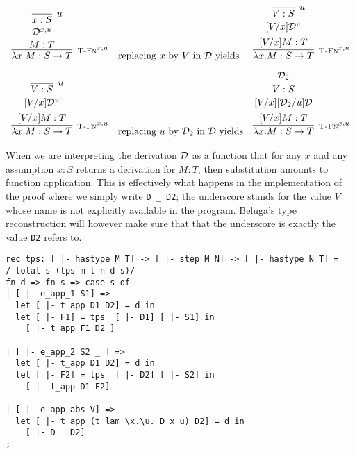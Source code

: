 \[
\begin{array}{c@{\quad}l@{\quad}c}
\infer[\TFn^{x,u}]
      {\lam x. M : S \arrow T}
      {\deduce[\vspace{2pt}]{M:T}
              {\deduce[\vspace{2pt}]{\D^{x,u}}
                      {\infer[u]{x:S}{}}}} &
\mbox{replacing $x$ by $V$ in $\D$ yields} &
\infer[\TFn^{x,u}]
      {\lam x. M : S \arrow T}
      {\deduce[\vspace{2pt}]{[V/x] M:T}
              {\deduce[\vspace{2pt}]{[V/x]\D^{u}}
                      {\infer[u]{V:S}{}}}}\\[1em]
\infer[\TFn^{x,u}]
      {\lam x. M : S \arrow T}
      {\deduce[\vspace{2pt}]{[V/x] M:T}
              {\deduce[\vspace{2pt}]{[V/x]\D^{u}}
                      {\infer[u]{V:S}{}}}} &
\mbox{replacing $u$ by $\D_2$ in $\D$ yields} &
\infer[\TFn^{x,u}]
      {\lam x. M : S \arrow T}
      {\deduce[\vspace{2pt}]{[V/x] M:T}
              {\deduce[\vspace{2pt}]{[V/x][\D_2/u]\D}
                      {\deduce[\vspace{2pt}]{V:S}{\D_2}}}}
\end{array}
\]

When we are interpreting the derivation ${\mathcal{D}}$ as a function that
for any $x$ and any assumption $x:S$ returns a derivation for $M:T$,
then substitution amounts to function application. This is effectively
what happens in the implementation of the proof where we simply write
\lstinline!D _ D2!; the underscore stands for the value $V$ whose name
is not explicitly available in the program. Beluga's type
reconstruction will however make sure that that the underscore is
exactly the value \lstinline!D2! refers to.


\begin{lstlisting}
rec tps: [ |- hastype M T] -> [ |- step M N] -> [ |- hastype N T] =
/ total s (tps m t n d s)/
fn d => fn s => case s of
| [ |- e_app_1 S1] =>
  let [ |- t_app D1 D2] = d in
  let [ |- F1] = tps  [ |- D1] [ |- S1] in
    [ |- t_app F1 D2 ]

| [ |- e_app_2 S2 _ ] =>
  let [ |- t_app D1 D2] = d in
  let [ |- F2] = tps  [ |- D2] [ |- S2] in
    [ |- t_app D1 F2]

| [ |- e_app_abs V] =>
  let [ |- t_app (t_lam \x.\u. D x u) D2] = d in
    [ |- D _ D2]
;
\end{lstlisting}

